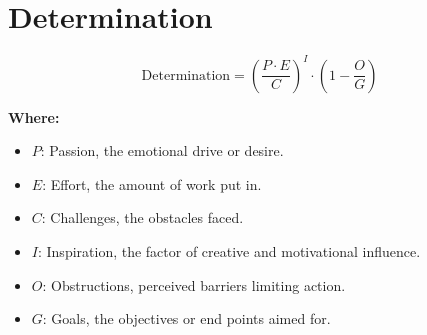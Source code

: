 \chapter{Determination}

\begin{equation}
\text{Determination} = \left( \frac{P \cdot E}{C} \right)^{I} \cdot \left( 1 - \frac{O}{G} \right)
\end{equation}

\textbf{Where:}

\begin{itemize}
    \item $P$: Passion, the emotional drive or desire.
    \item $E$: Effort, the amount of work put in.
    \item $C$: Challenges, the obstacles faced.
    \item $I$: Inspiration, the factor of creative and motivational influence.
    \item $O$: Obstructions, perceived barriers limiting action.
    \item $G$: Goals, the objectives or end points aimed for.
\end{itemize}